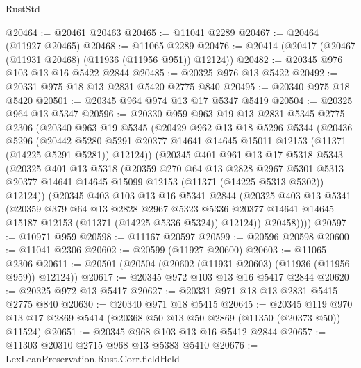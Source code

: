 \begin{lexlean}{RustStd}
\begin{coremodule}
@20464 := @20461 @20463
@20465 := @11041 @2289
@20467 := @20464 (@11927 @20465)
@20468 := @11065 @2289
@20476 := @20414 (@20417 (@20467 (@11931 @20468) (@11936 (@11956 @951)) @12124))
@20482 := @20345 @976 @103 @13 @16 @5422 @2844
@20485 := @20325 @976 @13 @5422
@20492 := @20331 @975 @18 @13 @2831 @5420 @2775 @840
@20495 := @20340 @975 @18 @5420
@20501 := @20345 @964 @974 @13 @17 @5347 @5419
@20504 := @20325 @964 @13 @5347
@20596 := @20330
    @959
    @963
    @19
    @13
    @2831
    @5345
    @2775
    @2306
    (@20340
      @963
      @19
      @5345
      (@20429
        @962
        @13
        @18
        @5296
        @5344
        (@20436
          @5296
          (@20442
            @5280
            @5291
            @20377
            @14641
            @14645
            @15011
            @12153
            (@11371 (@14225 @5291 @5281))
            @12124))
        (@20345
          @401
          @961
          @13
          @17
          @5318
          @5343
          (@20325
            @401
            @13
            @5318
            (@20359
              @270
              @64
              @13
              @2828
              @2967
              @5301
              @5313
              @20377
              @14641
              @14645
              @15099
              @12153
              (@11371 (@14225 @5313 @5302))
              @12124))
          (@20345
            @403
            @103
            @13
            @16
            @5341
            @2844
            (@20325
              @403
              @13
              @5341
              (@20359
                @379
                @64
                @13
                @2828
                @2967
                @5323
                @5336
                @20377
                @14641
                @14645
                @15187
                @12153
                (@11371 (@14225 @5336 @5324))
                @12124))
            @20458))))
@20597 := @10971 @959
@20598 := @11167 @20597
@20599 := @20596 @20598
@20600 := @11041 @2306
@20602 := @20599 (@11927 @20600)
@20603 := @11065 @2306
@20611 := @20501 (@20504 (@20602 (@11931 @20603) (@11936 (@11956 @959)) @12124))
@20617 := @20345 @972 @103 @13 @16 @5417 @2844
@20620 := @20325 @972 @13 @5417
@20627 := @20331 @971 @18 @13 @2831 @5415 @2775 @840
@20630 := @20340 @971 @18 @5415
@20645 := @20345
    @119
    @970
    @13
    @17
    @2869
    @5414
    (@20368 @50 @13 @50 @2869 (@11350 (@20373 @50)) @11524)
@20651 := @20345 @968 @103 @13 @16 @5412 @2844
@20657 := @11303 @20310 @2715 @968 @13 @5383 @5410
@20676 := LexLeanPreservation.Rust.Corr.fieldHeld

\end{coremodule}
\end{lexlean}
